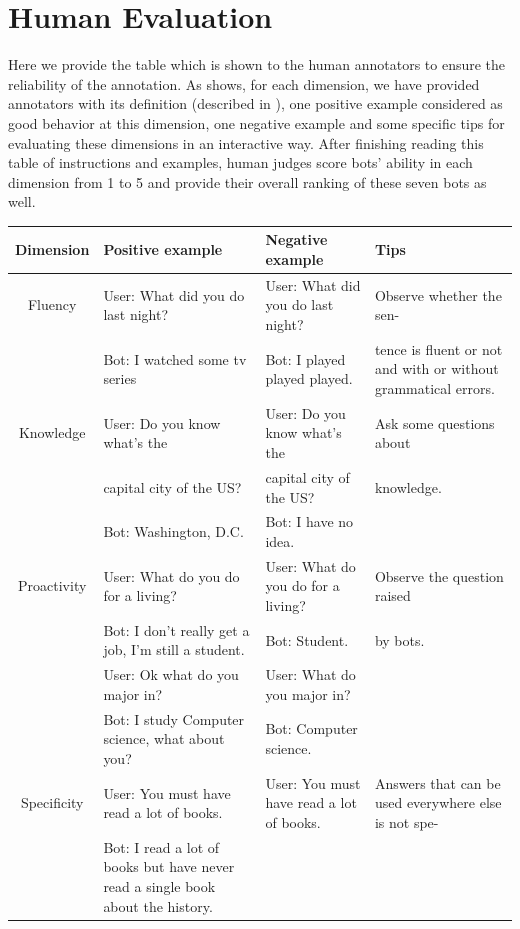 \section{Human Evaluation}
\label{sec:humanappend}
Here we provide the table which is shown 
to the human annotators to ensure the reliability of the  annotation.
As  shows, for each dimension, we have provided annotators
with its definition (described in ), 
one positive example considered as good 
behavior at this dimension,
one negative example and 
some specific tips for
evaluating these dimensions
in an interactive way.
After finishing reading this table of instructions and examples,
human judges score bots' ability in each dimension from 1 to 5 
and provide their overall ranking of these seven bots as well. 
\begin{table}[th]
\centering
\small
\begin{tabular}{cp{4.5cm}p{4.5cm}p{3.5cm}}
\toprule
\textbf{Dimension}  &\textbf{Positive example}&\textbf{Negative example}&\textbf{Tips} \\ \midrule
Fluency  & 
User: What did you do last night? &User: What did you do last night?& Observe whether the sen-\\
& Bot: I watched some tv series&Bot: I played played played.&tence is fluent or not and with or without grammatical errors.
\\
\midrule
Knowledge &   User: Do you know what's the&User: Do you know what’s the&Ask some questions about\\
&capital city of the US? &capital city of the US? &knowledge.\\
&  Bot: Washington, D.C.& Bot: I have no idea. &\\
\midrule
Proactivity &User: What do you do for a living?
& User: What do you do for a living? &Observe the question raised\\
& Bot: I don't really get a job, I'm still a student.&Bot: Student.&by bots.
\\
& User: Ok what do you major in? &User: What do you major in? &\\
& Bot: I study Computer science, what about you? 
&Bot: Computer science. &\\
\midrule
Specificity &
User: You must have read a lot of books. &User: You must have read a lot of books.
& Answers that can be used everywhere else is not spe-\\
& Bot:  I read a lot of books but have never read a single book about the history. 

\end{tabular}
\end{table}
